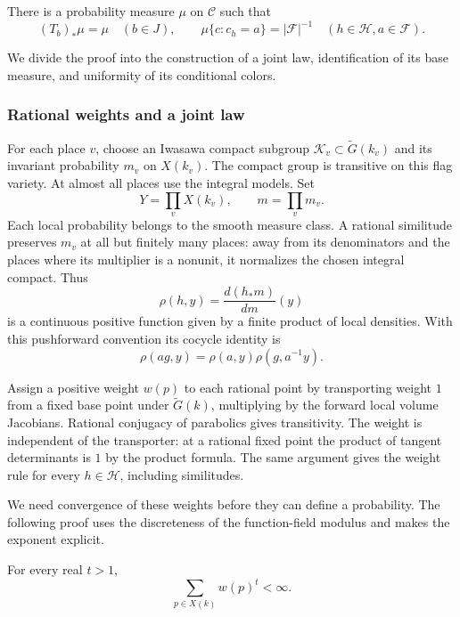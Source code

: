 \begin{proposition}\label{pal:uniform-law}
There is a probability measure $\mu$ on $\mathcal C$ such that
\[
 (T_b)_*\mu=\mu\quad(b\in J),\qquad
 \mu\{c:c_h=a\}=|\mathcal F|^{-1}
 \quad(h\in\mathcal H, a\in\mathcal F).
\]
\end{proposition}

We divide the proof into the construction of a joint law, identification
of its base measure, and uniformity of its conditional colors.

\subsubsection{Rational weights and a joint law}

For each place $v$, choose an Iwasawa compact subgroup
$\mathcal K_v\subset\widetilde G(k_v)$ and its invariant probability
$m_v$ on $X(k_v)$.  The compact group is transitive on this flag variety.
At almost all places use the integral models.  Set
\[
 Y=\prod_vX(k_v),\qquad m=\prod_vm_v.
\]
Each local probability belongs to the smooth measure class.  A rational
similitude preserves $m_v$ at all but finitely many places: away from its
denominators and the places where its multiplier is a nonunit, it
normalizes the chosen integral compact.  Thus
\[
 \rho(h,y)=\frac{d(h_*m)}{dm}(y)
\]
is a continuous positive function given by a finite product of local
densities.  With this pushforward convention its cocycle identity is
\begin{equation}\label{pal:cocycle}
 \rho(ag,y)=\rho(a,y)\rho(g,a^{-1}y).
\end{equation}

Assign a positive weight $w(p)$ to each rational point by transporting
weight $1$ from a fixed base point under $\widetilde G(k)$, multiplying
by the forward local volume Jacobians.  Rational conjugacy of parabolics
gives transitivity.  The weight is independent of the transporter:
at a rational fixed point the product of tangent determinants is $1$
by the product formula.  The same argument gives the weight rule for
every $h\in\mathcal H$, including similitudes.

We need convergence of these weights before they can define a probability.
The following proof uses the discreteness of the function-field modulus
and makes the exponent explicit.

\begin{lemma}\label{pal:weight-sum}
For every real $t>1$,
\[
 \sum_{p\in X(k)}w(p)^t<\infty.
\]
\end{lemma}

